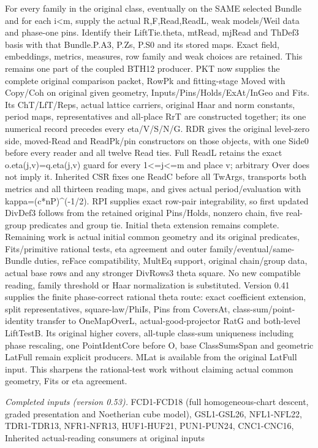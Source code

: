 For every family in the original class, eventually on the SAME selected Bundle and for each i<m, supply the actual R,F,Read,ReadL, weak models/Weil data and phase-one pins. Identify their LiftTie.theta, mtRead, mjRead and ThDef3 basis with that Bundle.P.A3, P.Zs, P.S0 and its stored maps. Exact field, embeddings, metrics, measures, row family and weak choices are retained. This remains one part of the coupled BTH12 producer. PKT now supplies the complete original comparison packet, RowPk and fitting-stage Moved with Copy/Coh on original given geometry, Inputs/Pins/Holds/ExAt/InGeo and Fits. Its ChT/LfT/Reps, actual lattice carriers, original Haar and norm constants, period maps, representatives and all-place RrT are constructed together; its one numerical record precedes every eta/V/S/N/G. RDR gives the original level-zero side, moved-Read and ReadPk/pin constructors on those objects, with one Side0 before every reader and all twelve Read ties. Full ReadL retains the exact o.eta(j,v)=q.eta(j,v) guard for every 1<=j<=m and place v; arbitrary Over does not imply it. Inherited CSR fixes one ReadC before all TwArgs, transports both metrics and all thirteen reading maps, and gives actual period/evaluation with kappa=(c*nP)\textasciicircum{}(-1/2). RPI supplies exact row-pair integrability, so first updated DivDef3 follows from the retained original Pins/Holds, nonzero chain, five real-group predicates and group tie. Initial theta extension remains complete. Remaining work is actual initial common geometry and its original predicates, Fits/primitive rational tests, eta agreement and outer family/eventual/same-Bundle duties, reFace compatibility, MultEq support, original chain/group data, actual base rows and any stronger DivRows3 theta square. No new compatible reading, family threshold or Haar normalization is substituted. Version 0.41 supplies the finite phase-correct rational theta route: exact coefficient extension, split representatives, square-law/PhiIs, Pins from CoversAt, class-sum/point-identity transfer to OneMapOverL, actual-good-projector RatG and both-level LiftTestB. Its original higher covers, all-tuple class-sum uniqueness including phase rescaling, one PointIdentCore before O, base ClassSumsSpan and geometric LatFull remain explicit producers. MLat is available from the original LatFull input. This sharpens the rational-test work without claiming actual common geometry, Fits or eta agreement.

\emph{Completed inputs (version 0.53).} FCD1-FCD18 (full homogeneous-chart descent, graded presentation and Noetherian cube model), GSL1-GSL26, NFL1-NFL22, TDR1-TDR13, NFR1-NFR13, HUF1-HUF21, PUN1-PUN24, CNC1-CNC16, Inherited actual-reading consumers at original inputs

